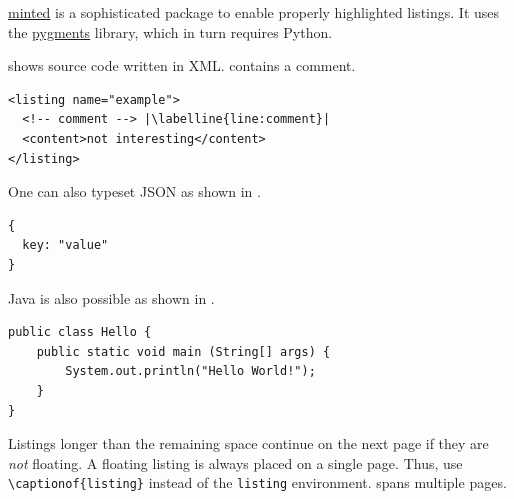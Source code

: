 \href{https://github.com/gpoore/minted}{minted} is a sophisticated package to enable properly highlighted listings.
It uses the \href{http://pygments.org/}{pygments} library, which in turn requires Python.

\begin{ltgexample}
 shows source code written in XML.
 contains a comment.

\begin{listing}[htbp]
  \begin{verbatim}
<listing name="example">
  <!-- comment --> |\labelline{line:comment}|
  <content>not interesting</content>
</listing>
\end{verbatim}
  \caption{Example XML listing using minted}
  \label{lst:XML}
\end{listing}
\end{ltgexample}

One can also typeset JSON as shown in .

\begin{ltgexample}
\begin{listing}[htbp]
  \begin{verbatim}
{
  key: "value"
}
\end{verbatim}
  \caption{Example JSON listing using minted}
  \label{lst:flJSON}
\end{listing}
\end{ltgexample}

Java is also possible as shown in .

\begin{ltgexample}
\begin{listing}[htbp]
  \begin{verbatim}
public class Hello {
    public static void main (String[] args) {
        System.out.println("Hello World!");
    }
}
\end{verbatim}
  \caption{Java code rendered using minted}
  \label{lst:flJava}
\end{listing}
\end{ltgexample}

Listings longer than the remaining space continue on the next page if they are \emph{not} floating.
A floating listing is always placed on a single page.
Thus, use \verb+\captionof{listing}+ instead of the \verb+listing+ environment.
 spans multiple pages.

